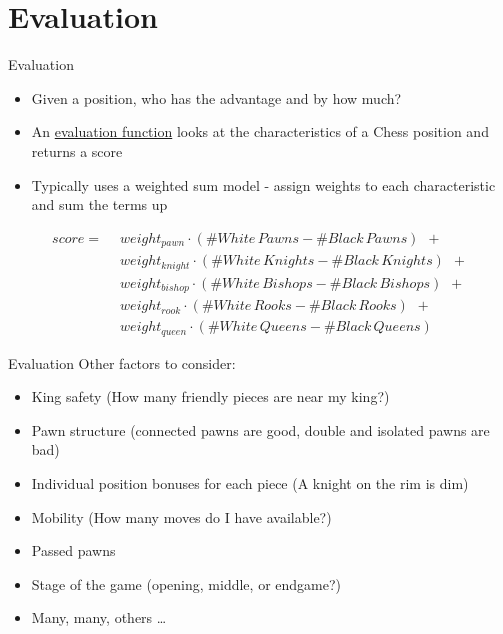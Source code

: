 \documentclass[xcolor=pdftex,dvipsnames,table]{beamer}
\begin{document}
\section{Evaluation}

\begin{frame}{Evaluation}
\begin{itemize}
\item Given a position, who has the advantage and by how much?
\item An \underline{evaluation function} looks at the characteristics of a Chess position and returns a score
\item Typically uses a weighted sum model - assign weights to each characteristic and sum the terms up
\end{itemize}
\vspace{5pt}
\begin{equation*}
\begin{split}
score = \hspace{5pt} & weight_{pawn}\cdot(\# White\,Pawns - \# Black\,Pawns) \hspace{5pt} + \\
		& weight_{knight}\cdot(\# White\,Knights - \# Black\,Knights) \hspace{5pt} + \\
        & weight_{bishop}\cdot(\# White\,Bishops - \# Black\,Bishops) \hspace{5pt} + \\
        & weight_{rook}\cdot(\# White\,Rooks - \# Black\,Rooks) \hspace{5pt} + \\
        & weight_{queen}\cdot(\# White\,Queens - \# Black\,Queens) \hspace{5pt}
\end{split}
\end{equation*}
\end{frame}

\begin{frame}{Evaluation}
Other factors to consider:
\begin{itemize}
\item King safety (How many friendly pieces are near my king?)
\item Pawn structure (connected pawns are good, double and isolated pawns are bad)
\item Individual position bonuses for each piece (A knight on the rim is dim)
\item Mobility (How many moves do I have available?)
\item Passed pawns
\item Stage of the game (opening, middle, or endgame?)
\item Many, many, others \dots
\end{itemize}
\end{frame}
\end{document}
